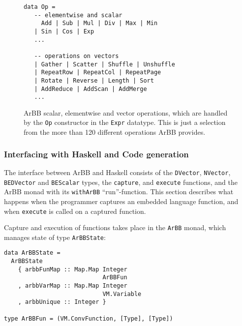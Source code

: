 


\begin{figure} 
\begin{minipage}{\linewidth}
\begin{Verbatim}[frame=single]
data Op =  
   -- elementwise and scalar
     Add | Sub | Mul | Div | Max | Min 
   | Sin | Cos | Exp 
   ... 
   
   -- operations on vectors 
   | Gather | Scatter | Shuffle | Unshuffle
   | RepeatRow | RepeatCol | RepeatPage 
   | Rotate | Reverse | Length | Sort 
   | AddReduce | AddScan | AddMerge
   ... 
\end{Verbatim}
\end{minipage}
\caption{  ArBB scalar, elementwise and vector operations, which are handled by the {\tt Op} constructor in the {\tt Expr} datatype.
          This is just a selection from the more than 120 different operations ArBB provides.}
\label{fig:OPS}
\end{figure}

\FloatBarrier

\subsubsection{Interfacing with Haskell and Code generation} 

The interface between ArBB and Haskell consists of the {\tt DVector}, {\tt NVector}, {\tt BEDVector} and {\tt BEScalar} types, 
the {\tt capture}, and {\tt execute} functions, and the ArBB monad with its {\tt withArBB} 
``run''-function. This section describes what happens when the programmer captures 
an embedded language function, and when {\tt execute} is called on a captured
function. 

Capture and execution of functions takes place in the {\tt ArBB} monad, which
manages state of type {\tt ArBBState}:

\begin{verbatim}
data ArBBState = 
  ArBBState 
    { arbbFunMap :: Map.Map Integer 
                            ArBBFun        
    , arbbVarMap :: Map.Map Integer 
                            VM.Variable 
    , arbbUnique :: Integer } 

type ArBBFun = (VM.ConvFunction, [Type], [Type])
\end{verbatim}

